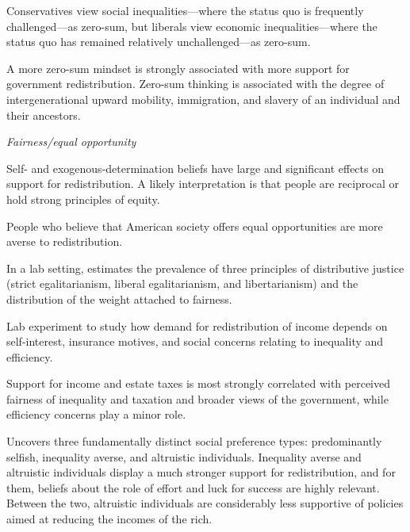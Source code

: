 \documentclass{article}
\newcommand{\citem}[1]{\medskip \noindent \textbf{\cite*{#1}}}
\newcommand{\textm}[1]{\medskip \noindent \textit{#1}}
\begin{document}
\citem{davidai2019politics}

Conservatives view social inequalities---where the status quo is frequently challenged---as zero-sum, but liberals view economic inequalities---where the status quo has remained relatively unchallenged---as zero-sum.

\citem{chinoy2026zero}

A more zero-sum mindset is strongly associated with more support for government redistribution. Zero-sum thinking is associated with the degree of intergenerational upward mobility, immigration, and slavery of an individual and their ancestors.

\textm{Fairness/equal opportunity}

\citem{fong2001social}

Self- and exogenous-determination beliefs have large and significant effects on support for
redistribution. A likely interpretation is that people are reciprocal or hold strong principles of equity.

\citem{alesina2005preferences}

People who believe that American society offers equal opportunities are more averse to redistribution.

\citem{cappelen2007pluralism}

In a lab setting, estimates the prevalence of three principles of distributive justice (strict egalitarianism, liberal egalitarianism, and libertarianism) and the distribution of the weight attached to fairness.

\citem{durante2014preferences}

Lab experiment to study how demand for redistribution of income depends on
self-interest, insurance motives, and social concerns relating to inequality and efficiency.

\citem{stantcheva2021understanding}

Support for income and estate taxes is most strongly correlated with perceived fairness of inequality and taxation and broader views of the government, while efficiency concerns play a minor role.

\citem{fehr2026social}

Uncovers three fundamentally distinct social preference types: predominantly selfish, inequality
averse, and altruistic individuals. Inequality averse and altruistic individuals display a much stronger support for redistribution, and for them, beliefs about the role of effort and luck for success are highly relevant.  Between the two, altruistic individuals are considerably less supportive of policies aimed at reducing the incomes of the rich.
\end{document}
